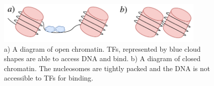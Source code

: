         \begin{figure}[H]
            \centering
            \includegraphics[width=0.9\textwidth]{OpenCloseChromatin.pdf}
            \caption{a) A diagram of open chromatin. TFs, represented by blue cloud shapes are able to access DNA and bind. b) A diagram of closed chromatin. The nucleosomes are tightly packed and the DNA is not accessible to TFs for binding.}
            \label{fig:openclose}
        \end{figure}

        


        
        
        
        
